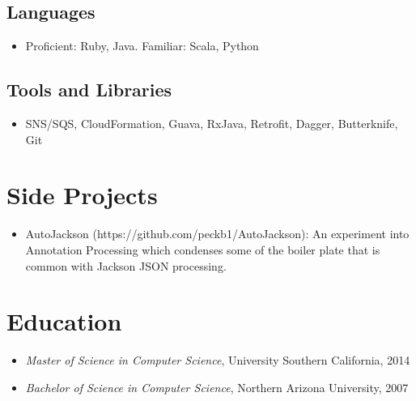 \documentclass[11pt]{article}
\begin{document}
\subsection*{Languages}
\label{sec-2-1}

\begin{itemize}
\item Proficient: Ruby, Java. Familiar: Scala, Python
\end{itemize}
\subsection*{Tools and Libraries}
\label{sec-2-2}

\begin{itemize}
\item SNS/SQS, CloudFormation, Guava, RxJava, Retrofit, Dagger, Butterknife, Git
\end{itemize}
\section*{Side Projects}
\begin{itemize}
\item AutoJackson (https://github.com/peckb1/AutoJackson): An experiment into Annotation Processing which condenses some of the boiler plate that is common with Jackson JSON processing. 
\end{itemize}



\section*{Education}
\label{sec-4}

\begin{itemize}
\item \emph{Master of Science in Computer Science}, University Southern California, 2014
\item \emph{Bachelor of Science in Computer Science}, Northern Arizona University, 2007
\end{itemize}
\end{document}

